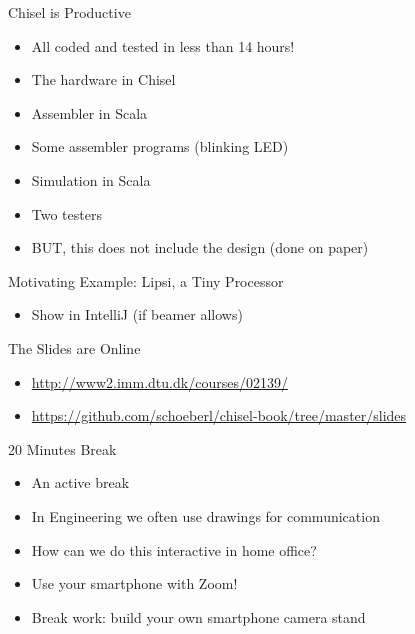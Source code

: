 \begin{frame}[fragile]{Chisel is Productive}
\begin{itemize}
\item All coded and tested in less than 14 hours!
\end{itemize}
\begin{itemize}
\item The hardware in Chisel
\item Assembler in Scala
\item Some assembler programs (blinking LED)
\item Simulation in Scala
\item Two testers
\end{itemize}
\begin{itemize}
\item BUT, this does not include the design (done on paper)
\end{itemize}
\end{frame}

\begin{frame}[fragile]{Motivating Example: Lipsi, a Tiny Processor}
\begin{itemize}
\item Show in IntelliJ (if beamer allows)
\end{itemize}
\end{frame}

\begin{frame}[fragile]{The Slides are Online}
\begin{itemize}
\item \url{http://www2.imm.dtu.dk/courses/02139/}
\item \url{https://github.com/schoeberl/chisel-book/tree/master/slides}
\end{itemize}
\end{frame}

\begin{frame}[fragile]{20 Minutes Break}
\begin{itemize}
\item An active break
\item In Engineering we often use drawings for communication
\item How can we do this interactive in home office?
\item Use your smartphone with Zoom!
\item Break work: build your own smartphone camera stand
\end{itemize}
\end{frame}

